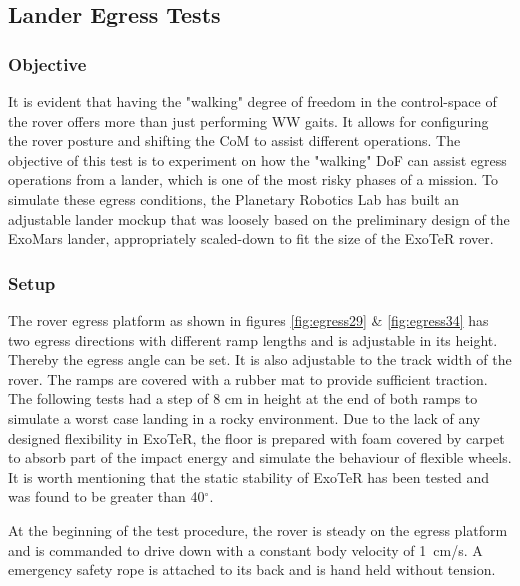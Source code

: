 \documentclass[a4paper,twocolumn]{esapub2005} %
\begin{document}

\subsection{Lander Egress Tests} 

\subsubsection{Objective}
It is evident that having the "walking" degree of freedom in the control-space
of the rover offers more than just performing WW gaits. It allows for
configuring the rover posture and shifting the CoM to assist different
operations. The objective of this test is to experiment on how the "walking"
DoF can assist egress operations from a lander, which is one of the most risky
phases of a mission. To simulate these egress conditions, the Planetary
Robotics Lab has built an adjustable lander mockup that was loosely based on
the preliminary design of the ExoMars lander, appropriately scaled-down to fit
the size of the ExoTeR rover. 

\subsubsection{Setup}
The rover egress platform as shown in figures \ref{fig:egress29} \&
\ref{fig:egress34} has two egress directions with different ramp lengths and is
adjustable in its height. Thereby the egress angle can be set. It is also
adjustable to the track width of the rover. The ramps are covered with a rubber
mat to provide sufficient traction. The following tests had a step of 8 cm in
height at the end of both ramps to simulate a worst case landing in a rocky
environment.  Due to the lack of any designed flexibility in ExoTeR, the floor
is prepared with foam covered by carpet to absorb part of the impact energy and
simulate the behaviour of flexible wheels. It is worth mentioning that the
static stability of ExoTeR has been tested and was found to be greater than
40$^\circ$.

At the beginning of the test procedure, the rover is steady on the egress
platform and is commanded to drive down with a constant body velocity of
1~\unit{cm/s}. A emergency safety rope is attached to its back and is hand held
without tension. 
\end{document}
